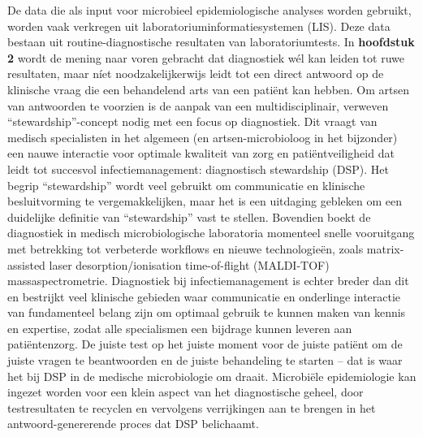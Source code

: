 \documentclass[
]{book}
\begin{document}
De data die als input voor microbieel epidemiologische analyses worden gebruikt, worden vaak verkregen uit laboratoriuminformatiesystemen (LIS). Deze data bestaan uit routine-diagnostische resultaten van laboratoriumtests. In \textbf{hoofdstuk 2} wordt de mening naar voren gebracht dat diagnostiek wél kan leiden tot ruwe resultaten, maar níet noodzakelijkerwijs leidt tot een direct antwoord op de klinische vraag die een behandelend arts van een patiënt kan hebben. Om artsen van antwoorden te voorzien is de aanpak van een multidisciplinair, verweven ``stewardship''-concept nodig met een focus op diagnostiek. Dit vraagt van medisch specialisten in het algemeen (en artsen-microbioloog in het bijzonder) een nauwe interactie voor optimale kwaliteit van zorg en patiëntveiligheid dat leidt tot succesvol infectiemanagement: diagnostisch stewardship (DSP). Het begrip ``stewardship'' wordt veel gebruikt om communicatie en klinische besluitvorming te vergemakkelijken, maar het is een uitdaging gebleken om een duidelijke definitie van ``stewardship'' vast te stellen. Bovendien boekt de diagnostiek in medisch microbiologische laboratoria momenteel snelle vooruitgang met betrekking tot verbeterde workflows en nieuwe technologieën, zoals matrix-assisted laser desorption/ionisation time-of-flight (MALDI-TOF) massaspectrometrie. Diagnostiek bij infectiemanagement is echter breder dan dit en bestrijkt veel klinische gebieden waar communicatie en onderlinge interactie van fundamenteel belang zijn om optimaal gebruik te kunnen maken van kennis en expertise, zodat alle specialismen een bijdrage kunnen leveren aan patiëntenzorg. De juiste test op het juiste moment voor de juiste patiënt om de juiste vragen te beantwoorden en de juiste behandeling te starten -- dat is waar het bij DSP in de medische microbiologie om draait. Microbiële epidemiologie kan ingezet worden voor een klein aspect van het diagnostische geheel, door testresultaten te recyclen en vervolgens verrijkingen aan te brengen in het antwoord-genererende proces dat DSP belichaamt.
\end{document}
